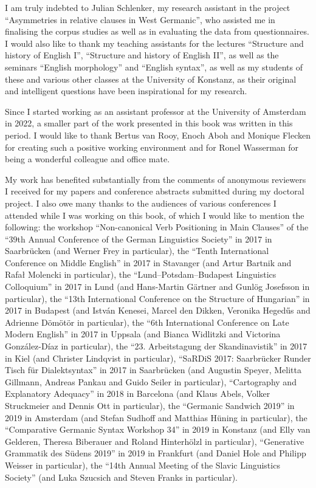 I am truly indebted to Julian Schlenker, my research assistant in the project ``Asymmetries in relative clauses in West Germanic'', who assisted me in finalising the corpus studies as well as in evaluating the data from questionnaires. I would also like to thank my teaching assistants for the lectures ``Structure and history of English I'', ``Structure and history of English II'', as well as the seminars ``English morphology'' and ``English syntax'', as well as my students of these and various other classes at the University of Konstanz, as their original and intelligent questions have been inspirational for my research.

Since I started working as an assistant professor at the University of Amsterdam in 2022, a smaller part of the work presented in this book was written in this period. I would like to thank Bertus van Rooy, Enoch Aboh and Monique Flecken for creating such a positive working environment and for Ronel Wasserman for being a wonderful colleague and office mate.  

My work has benefited substantially from the comments of anonymous reviewers I received for my papers and conference abstracts submitted during my doctoral project. I also owe many thanks to the audiences of various conferences I attended while I was working on this book, of which I would like to mention the following: the workshop ``Non-canonical Verb Positioning in Main Clauses'' of the ``39th Annual Conference of the German Linguistics Society'' in 2017 in Saarbrücken (and Werner Frey in particular), the ``Tenth International Conference on Middle English'' in 2017 in Stavanger (and Artur Bartnik and Rafał Molencki in particular), the ``Lund--Potsdam--Budapest Linguistics Colloquium'' in  2017 in Lund (and Hans-Martin Gärtner and Gunlög Josefsson in particular), the ``13th International Conference on the Structure of Hungarian'' in 2017 in Budapest (and Istv\'an Kenesei, Marcel den Dikken, Veronika Hegedűs and Adrienne Dömötör in particular), the ``6th International Conference on Late Modern English'' in 2017 in Uppsala (and Bianca Widlitzki and Victorina Gonz\'alez-D\'iaz in particular), the ``23. Arbeitstagung der Skandinavistik'' in 2017 in Kiel (and Christer Lindqvist in particular), ``SaRDiS 2017: Saarbrücker Runder Tisch für Dialektsyntax'' in 2017 in Saarbrücken (and Augustin Speyer, Melitta Gillmann, Andreas Pankau and Guido Seiler in particular), ``Cartography and Explanatory Adequacy'' in 2018 in Barcelona (and Klaus Abels, Volker Struckmeier and Dennis Ott in particular), the ``Germanic Sandwich 2019'' in 2019 in Amsterdam (and Stefan Sudhoff and Matthias Hüning in particular), the ``Comparative Germanic Syntax Workshop 34'' in 2019 in Konstanz (and Elly van Gelderen, Theresa Biberauer and Roland Hinterhölzl in particular), ``Generative Grammatik des Südens 2019'' in 2019 in Frankfurt (and Daniel Hole and Philipp Weisser in particular), the ``14th Annual Meeting of the Slavic Linguistics Society'' (and Luka Szucsich and Steven Franks in particular).

